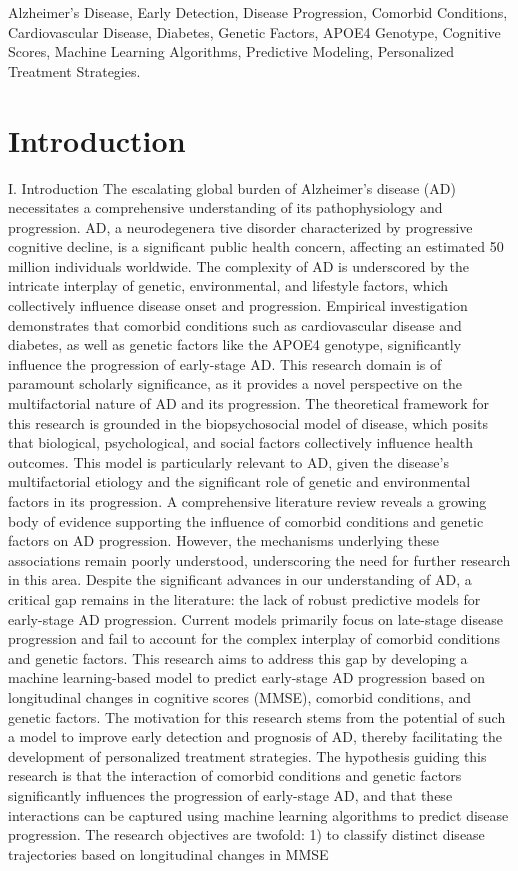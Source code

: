 \documentclass[conference]{IEEEtran}
\begin{document}
\begin{IEEEkeywords}
Alzheimer's Disease, Early Detection, Disease Progression, Comorbid Conditions, Cardiovascular Disease, Diabetes, Genetic Factors, APOE4 Genotype, Cognitive Scores, Machine Learning Algorithms, Predictive Modeling, Personalized Treatment Strategies.
\end{IEEEkeywords}

\section{Introduction}
I. Introduction The escalating global burden of Alzheimer's disease (AD) necessitates a comprehensive understanding of its pathophysiology and progression. AD, a neurodegenera tive disorder characterized by progressive cognitive decline, is a significant public health concern, affecting an estimated 50 million individuals worldwide. The complexity of AD is underscored by the intricate interplay of genetic, environmental, and lifestyle factors, which collectively influence disease onset and progression. Empirical investigation demonstrates that comorbid conditions such as cardiovascular disease and diabetes, as well as genetic factors like the APOE4 genotype, significantly influence the progression of early-stage AD. This research domain is of paramount scholarly significance, as it provides a novel perspective on the multifactorial nature of AD and its progression. The theoretical framework for this research is grounded in the biopsychosocial model of disease, which posits that biological, psychological, and social factors collectively influence health outcomes. This model is particularly relevant to AD, given the disease's multifactorial etiology and the significant role of genetic and environmental factors in its progression. A comprehensive literature review reveals a growing body of evidence supporting the influence of comorbid conditions and genetic factors on AD progression. However, the mechanisms underlying these associations remain poorly understood, underscoring the need for further research in this area. Despite the significant advances in our understanding of AD, a critical gap remains in the literature: the lack of robust predictive models for early-stage AD progression. Current models primarily focus on late-stage disease progression and fail to account for the complex interplay of comorbid conditions and genetic factors. This research aims to address this gap by developing a machine learning-based model to predict early-stage AD progression based on longitudinal changes in cognitive scores (MMSE), comorbid conditions, and genetic factors. The motivation for this research stems from the potential of such a model to improve early detection and prognosis of AD, thereby facilitating the development of personalized treatment strategies. The hypothesis guiding this research is that the interaction of comorbid conditions and genetic factors significantly influences the progression of early-stage AD, and that these interactions can be captured using machine learning algorithms to predict disease progression. The research objectives are twofold: 1) to classify distinct disease trajectories based on longitudinal changes in MMSE 
\end{document}
